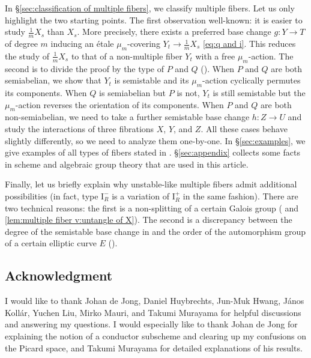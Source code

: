 \documentclass[reqno, letterpaper]{amsart}
\numberwithin{equation}{subsection}
\let\to\longrightarrow
\begin{document}
		In \S \ref{sec:classification of multiple fibers}, we classify multiple fibers. Let us only highlight the two starting points. The first observation well-known: it is easier to study $\frac{1}{m}X_s$ than $X_s$. More precisely, there exists a preferred base change $g : Y \to T$ of degree $m$ inducing an \'etale $\mu_m$-covering $Y_t \to \frac{1}{m}X_s$ \eqref{eq:q and i}. This reduces the study of $\frac{1}{m}X_s$ to that of a non-multiple fiber $Y_t$ with a free $\mu_m$-action. The second is to divide the proof by the type of $P$ and $Q$ (). When $P$ and $Q$ are both semiabelian, we show that $Y_t$ is semistable and its $\mu_m$-action cyclically permutes its components. When $Q$ is semiabelian but $P$ is not, $Y_t$ is still semistable but the $\mu_m$-action reverses the orientation of its components. When $P$ and $Q$ are both non-semiabelian, we need to take a further semistable base change $h : Z \to U$ and study the interactions of three fibrations $X$, $Y$, and $Z$. All these cases behave slightly differently, so we need to analyze them one-by-one. In \S \ref{sec:examples}, we give examples of all types of fibers stated in . \S \ref{sec:appendix} collects some facts in scheme and algebraic group theory that are used in this article.
		
		\medskip
		
		Finally, let us briefly explain why unstable-like multiple fibers admit additional possibilities (in fact, type $\mathrm I^-_R$ is a variation of $\mathrm I^+_R$ in the same fashion). There are two technical reasons: the first is a non-splitting of a certain Galois group ( and \ref{lem:multiple fiber v:untangle of X}). The second is a discrepancy between the degree of the semistable base change in  and the order of the automorphism group of a certain elliptic curve $E$ ().
		
		
		
	\subsection*{Acknowledgment}
		I would like to thank Johan de Jong, Daniel Huybrechts, Jun-Muk Hwang, J\'anos Koll\'ar, Yuchen Liu, Mirko Mauri, and Takumi Murayama for helpful discussions and answering my questions. I would especially like to thank Johan de Jong for explaining the notion of a conductor subscheme and clearing up my confusions on the Picard space, and Takumi Murayama for detailed explanations of his results.
		
\end{document}
